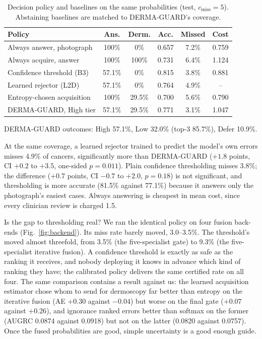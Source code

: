 \documentclass[conference]{IEEEtran}
\begin{document}
\begin{table}[!t]
\caption{Decision policy and baselines on the same probabilities (test, $c_{\mathrm{miss}}=5$). Abstaining baselines are matched to DERMA-GUARD's coverage.}
\label{tab:policy}
\centering\footnotesize
\begin{tabular}{lccccc}
\toprule
Policy & Ans. & Derm. & Acc. & Missed & Cost \\
\midrule
Always answer, photograph & 100\% & 0\% & 0.657 & 7.2\% & 0.759 \\
Always acquire, answer & 100\% & 100\% & 0.731 & 6.4\% & 1.124 \\
Confidence threshold (B3) & 57.1\% & 0\% & 0.815 & 3.8\% & 0.881 \\
Learned rejector (L2D) & 57.1\% & 0\% & 0.764 & 4.9\% & -- \\
Entropy-chosen acquisition & 100\% & 29.5\% & 0.700 & 5.6\% & 0.790 \\
DERMA-GUARD, High tier & 57.1\% & 29.5\% & 0.771 & 3.1\% & 1.047 \\
\bottomrule
\end{tabular}

\smallskip
\raggedright\scriptsize DERMA-GUARD outcomes: High 57.1\%, Low 32.0\% (top-3 85.7\%), Defer 10.9\%.
\end{table}

At the same coverage, a learned rejector trained to predict the model's own errors \cite{r25} misses 4.9\% of cancers, significantly more than DERMA-GUARD ($+1.8$ points, CI $+0.2$ to $+3.5$, one-sided $p=0.011$). Plain confidence thresholding misses 3.8\%; the difference ($+0.7$ points, CI $-0.7$ to $+2.0$, $p=0.18$) is not significant, and thresholding is more accurate (81.5\% against 77.1\%) because it answers only the photograph's easiest cases. Always answering is cheapest in mean cost, since every clinician review is charged 1.5.

Is the gap to thresholding real? We ran the identical policy on four fusion back-ends (Fig.~\ref{fig:backend}). Its miss rate barely moved, 3.0--3.5\%. The threshold's moved almost threefold, from 3.5\% (the five-specialist gate) to 9.3\% (the five-specialist iterative fusion). A confidence threshold is exactly as safe as the ranking it receives, and nobody deploying it knows in advance which kind of ranking they have; the calibrated policy delivers the same certified rate on all four. The same comparison contains a result against us: the learned acquisition estimator chose whom to send for dermoscopy far better than entropy on the iterative fusion (AE $+0.30$ against $-0.04$) but worse on the final gate ($+0.07$ against $+0.26$), and ignorance ranked errors better than softmax on the former (AUGRC 0.0874 against 0.0918) but not on the latter (0.0820 against 0.0757). Once the fused probabilities are good, simple uncertainty is a good enough guide.
\end{document}
